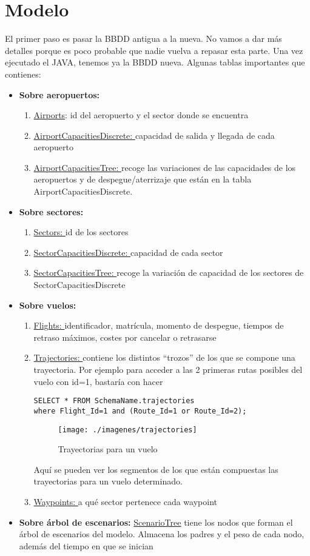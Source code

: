 \section{Modelo}
El primer paso es pasar la BBDD antigua a la nueva. No vamos a dar más detalles porque es poco probable que nadie vuelva a repasar esta parte. Una vez ejecutado el JAVA, tenemos ya la BBDD nueva. Algunas tablas importantes que contienes:
\begin{itemize}
\item \textbf{Sobre aeropuertos: }
\begin{enumerate}
\item \underline{Airports}: id del aeropuerto y el sector donde se encuentra
\item \underline{AirportCapacitiesDiscrete: }capacidad de salida y llegada de cada aeropuerto
\item \underline{AirportCapacitiesTree: }recoge las variaciones de las capacidades de los aeropuertos y de despegue/aterrizaje que están en la tabla AirportCapacitiesDiscrete.
\end{enumerate}
\item \textbf{Sobre sectores: }
\begin{enumerate}
\item \underline{Sectors: }id de los sectores
\item \underline{SectorCapacitiesDiscrete: }capacidad de cada sector
\item \underline{SectorCapacitiesTree: }recoge la variación de capacidad de los sectores de SectorCapacitiesDiscrete
\end{enumerate}
\item \textbf{Sobre vuelos: }
\begin{enumerate}
\item \underline{Flights: }identificador, matrícula, momento de despegue, tiempos de retraso máximos, costes por cancelar o retrasarse 
\item \underline{Trajectories: }contiene los distintos ``trozos'' de los que se compone una trayectoria. Por ejemplo para acceder a las 2 primeras rutas posibles del vuelo con id=1, bastaría con hacer 
\begin{verbatim}
SELECT * FROM SchemaName.trajectories
where Flight_Id=1 and (Route_Id=1 or Route_Id=2);
\end{verbatim} 
\begin{figure}[h]
\centering
  \texttt{[image: ./imagenes/trajectories]}
  \caption{Trayectorias para un vuelo}
  \label{fig: Trayectorias para un vuelo}
\end{figure}
Aquí se pueden ver los segmentos de los que están compuestas las trayectorias para un vuelo determinado.
\item \underline{Waypoints: }a qué sector pertenece cada waypoint
\end{enumerate}
\item \textbf{Sobre árbol de escenarios: }\underline{ScenarioTree} tiene los nodos que forman el árbol de escenarios del modelo. Almacena los padres y el peso de cada nodo, además del tiempo en que se inician
\end{itemize}

